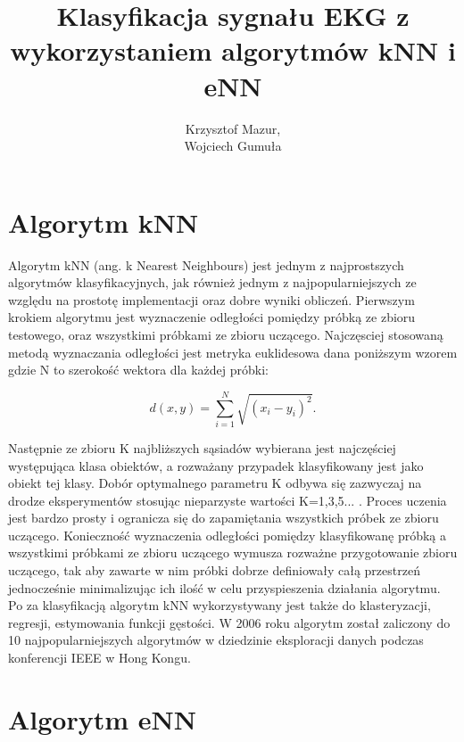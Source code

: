 \documentclass[12pt]{report}
\title{Klasyfikacja sygnału EKG z wykorzystaniem algorytmów kNN i eNN}
\author{Krzysztof Mazur, \\ Wojciech Gumuła}
\begin{document}
\maketitle


\tableofcontents

\chapter{Algorytm kNN}
\large{Algorytm kNN (ang. k Nearest Neighbours)  jest jednym z najprostszych algorytmów klasyfikacyjnych, jak również jednym z najpopularniejszych ze względu na prostotę implementacji oraz dobre wyniki obliczeń. Pierwszym krokiem algorytmu jest wyznaczenie odległości pomiędzy próbką ze zbioru testowego, oraz wszystkimi próbkami ze zbioru uczącego. Najczęsciej stosowaną metodą wyznaczania odległości jest metryka euklidesowa dana poniższym wzorem gdzie N to szerokość wektora dla każdej próbki:

\begin{equation}
d(x,y) = \sum_{i=1}^{N} \sqrt{(x_i - y_i)^2}.
\end{equation}

Następnie ze zbioru K najbliższych sąsiadów wybierana jest najczęściej występująca klasa obiektów, a rozważany przypadek klasyfikowany jest jako obiekt tej klasy. Dobór optymalnego parametru K odbywa się zazwyczaj na drodze eksperymentów stosując nieparzyste wartości K=1,3,5... . Proces uczenia jest bardzo prosty i ogranicza się do zapamiętania wszystkich próbek ze zbioru uczącego. Konieczność wyznaczenia odległości pomiędzy klasyfikowanę próbką a wszystkimi próbkami ze zbioru uczącego wymusza rozważne przygotowanie zbioru uczącego, tak aby zawarte w nim próbki dobrze definiowały całą przestrzeń jednocześnie minimalizując ich ilość w celu przyspieszenia działania algorytmu.  Po za klasyfikacją algorytm kNN wykorzystywany jest także do klasteryzacji, regresji, estymowania funkcji gęstości. W 2006 roku algorytm został zaliczony do 10 najpopularniejszych algorytmów w dziedzinie eksploracji danych podczas konferencji IEEE w Hong Kongu.}


\chapter{Algorytm eNN}
\end{document}
